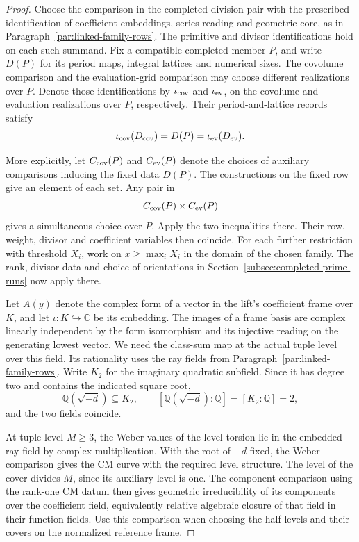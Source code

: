 \begin{proof}
Choose the comparison in the completed division pair with
the prescribed identification of coefficient embeddings, series
reading and geometric core, as in Paragraph~\ref{par:linked-family-rows}.
The primitive and divisor identifications hold on each such
summand. Fix a compatible completed member \(P\), and write \(D(P)\) for
its period maps, integral lattices and numerical sizes. The covolume
comparison and the evaluation-grid comparison may choose different
realizations over \(P\). Denote those identifications by \(\iota_{\rm cov}\) and
\(\iota_{\rm ev}\), on the covolume and evaluation realizations
over \(P\), respectively. Their period-and-lattice records satisfy
\[
         \iota_{\rm cov}(D_{\rm cov})=D(P)
                                =\iota_{\rm ev}(D_{\rm ev}).
\]


More explicitly, let \(C_{\rm cov}(P)\) and \(C_{\rm ev}(P)\) denote the choices of auxiliary comparisons inducing the fixed data \(D(P)\). The constructions on the fixed row give an element of each set. Any pair in
\[
                  C_{\rm cov}(P)\times C_{\rm ev}(P)
\]
gives a simultaneous choice over \(P\). Apply the two inequalities there. Their
row, weight, divisor and coefficient variables then coincide. For each further restriction
with threshold \(X_i\), work on \(x\ge\max_i X_i\) in the
domain of the chosen family.
The rank, divisor data and choice of orientations in
Section~\ref{subsec:completed-prime-runs} now apply there.
\label{cor:joint-family-estimate-1}

Let \(A(y)\) denote the complex form of a vector in the lift's
coefficient frame over \(K\), and let \(\iota:K\hookrightarrow
\mathbb C\) be its embedding. The images of a frame basis are
complex linearly independent by the form isomorphism and its
injective reading on the generating lowest vector. We need the
class-sum map at the actual tuple level over this field. Its
rationality uses the ray fields from Paragraph~\ref{par:linked-family-rows}.
Write \(K_{2}\) for the imaginary quadratic subfield. Since it has degree two and contains the indicated square root,
\[
 \mathbb Q(\sqrt{-d})\subseteq K_{2},\qquad [\mathbb Q(\sqrt{-d}):\mathbb Q]=[K_{2}:\mathbb Q]=2,
\]
and the two fields coincide.

At tuple level \(M\ge3\), the Weber values of
the level torsion lie in the embedded ray field by complex
multiplication. With the root of \(-d\) fixed, the Weber comparison
gives the CM curve with the required level structure. The level
of the cover divides \(M\), since its auxiliary level is one.
The component comparison using the rank-one CM datum then gives
geometric irreducibility of its components over the coefficient
field, equivalently relative algebraic closure of that field in
their function fields. Use this comparison when choosing the half
levels and their covers on the normalized reference frame.


\end{proof}
